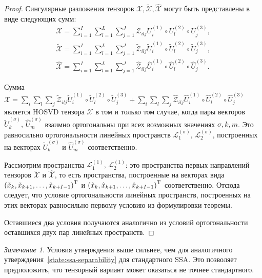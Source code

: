 \documentclass[specialist,
  substylefile=spbu.rtx,
subf,href,colorlinks=true, 12pt]{disser}
\theoremstyle{plain}
\theoremstyle{definition}
\theoremstyle{remark}
\newtheorem*{remark}{Замечание}
\begin{document}
\begin{proof}
  Сингулярные разложения тензоров $\mathcal{X}, \widetilde{\mathcal{X}}, \widehat{\mathcal{X}}$
  могут быть представлены в виде
  следующих сумм:
  \[
    \begin{aligned}
      \mathcal{X}=\sum_{i=1}^{I} \sum_{l=1}^{L} \sum_{j=1}^{J} \mathcal{Z}_{ilj} U^{(1)}_{i}
      \circ U^{(2)}_{l} \circ U^{(3)}_{j},\\
      \widetilde{\mathcal{X}}=\sum_{i=1}^{I} \sum_{l=1}^{L} \sum_{j=1}^{J} \widetilde{\mathcal{Z}}_{ilj}
      \widetilde{U}^{(1)}_{i} \circ \widetilde{U}^{(2)}_{l} \circ \widetilde{U}^{(3)}_{j},\\
      \widehat{\mathcal{X}}=\sum_{i=1}^{I} \sum_{l=1}^{L} \sum_{j=1}^{J} \widehat{\mathcal{Z}}_{ilj}
      \widehat{U}^{(1)}_{i} \circ \widehat{U}^{(2)}_{l} \circ \widehat{U}^{(3)}_{j}.
    \end{aligned}
  \]

  Сумма $\mathcal{X} = \sum_{i} \sum_{l} \sum_{j} \widetilde{\mathcal{Z}}_{ilj}
  \widetilde{U}^{(1)}_{i} \circ \widetilde{U}^{(2)}_{l} \circ \widetilde{U}^{(3)}_{j} +
  \sum_{i} \sum_{l} \sum_{j} \widehat{\mathcal{Z}}_{ilj} \widehat{U}^{(1)}_{i} \circ \widehat{U}^{(2)}_{l}
  \circ \widehat{U}^{(3)}_{j}$ является HOSVD тензора $\mathcal{X}$ в том и только том случае, когда
  пары векторов $\widetilde{U}^{(\sigma)}_{k},\, \widehat{U}^{(\sigma)}_{m}$ взаимно ортогональны
  при всех возможных значениях $\sigma, k, m$.
  Это равносильно ортогональности линейных пространств $\mathcal{L}^{(\sigma)}_{1},\, \mathcal{L}^{(\sigma)}_{2}$,
  построенных на векторах $\widetilde{U}^{(\sigma)}_{k}$ и $\widehat{U}^{(\sigma)}_{m}$ соответственно.

  Рассмотрим пространства $\mathcal{L}^{(1)}_{1},\, \mathcal{L}^{(1)}_{2}$: это пространства первых направлений
  тензоров $\widetilde{\mathcal{X}}$ и $\widehat{\mathcal{X}}$, то есть пространства, построенные на векторах вида $\left(\tilde{x}_k, \tilde{x}_{k+1}, \ldots, \tilde{x}_{k+I-1}\right)^{\mathrm{T}}$ и
  $\left(\hat{x}_k, \hat{x}_{k+1}, \ldots, \hat{x}_{k+I-1}\right)^{\mathrm{T}}$ соответственно.
  Отсюда следует, что условие ортогональности линейных пространств, построенных на этих векторах
  равносильно первому условию из формулировки теоремы.

  Оставшиеся два условия получаются аналогично из условий ортогональности оставшихся двух пар линейных пространств.
\end{proof}

\begin{remark}
  Условия утверждения выше сильнее, чем для аналогичного утверждения~\ref{state:ssa-separability}
  для стандартного SSA.
  Это позволяет предположить, что тензорный вариант может оказаться не точнее стандартного.
\end{remark}
\end{document}
